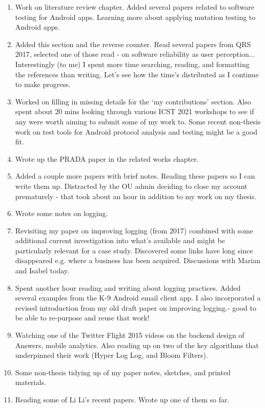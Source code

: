 \begin{enumerate}
    \item Work on literature review chapter. Added several papers related to software testing for Android apps. Learning more about applying mutation testing to Android apps.
    \item Added this section and the reverse counter. Read several papers from QRS 2017, selected one of those read - on software reliability as user perception... Interestingly (to me) I spent more time searching, reading, and formatting the references than writing. Let's see how the time's distributed as I continue to make progress.
    \item Worked on filling in missing details for the `my contributions' section. Also spent about 20 mins looking through various ICST 2021 workshops to see if any were worth aiming to submit some of my work to. Some recent non-thesis work on test tools for Android protocol analysis and testing might be a good fit.
    \item Wrote up the PRADA paper in the related works chapter. 
    \item Added a couple more papers with brief notes. Reading these papers so I can write them up. Distracted by the OU admin deciding to close my account prematurely - that took about an hour in addition to my work on my thesis.
    \item Wrote some notes on logging.
    \item Revisiting my paper on improving logging (from 2017) combined with some additional current investigation into what's available and might be particularly relevant for a case study. Discovered some links have long since disappeared e.g. where a business has been acquired. Discussions with Marian and Isabel today.
    \item Spent another hour reading and writing about logging practices. Added several examples from the K-9 Android email client app. I also incorporated a revised introduction from my old draft paper on improving logging.- good to be able to re-purpose and reuse that work!
    \item Watching one of the Twitter Flight 2015 videos on the backend design of Answers, mobile analytics. Also reading up on two of the key algorithms that underpinned their work (Hyper Log Log, and Bloom Filters).
    \item Some non-thesis tidying up of my paper notes, sketches, and printed materials.
    \item Reading some of Li Li's recent papers. Wrote up one of them so far.

\end{enumerate}
